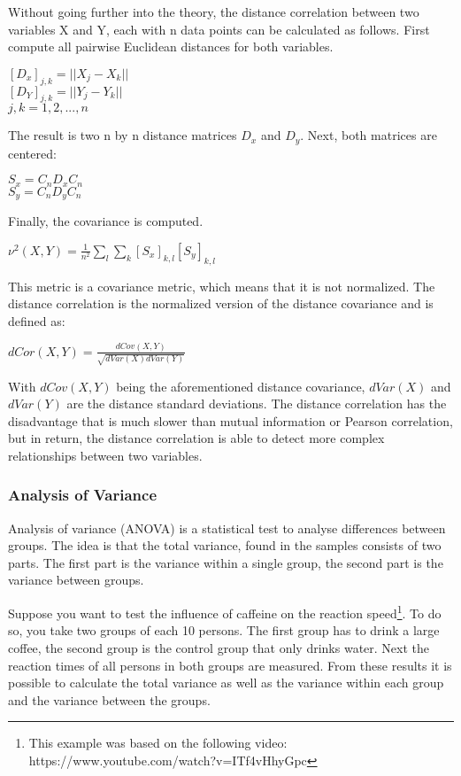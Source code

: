 Without going further into the theory, the distance correlation between two variables X and Y, each with n data points can be calculated as follows.
First compute all pairwise Euclidean distances for both variables.
\begin{center}
$[D_x]_{j,k} = || X_j - X_k||$ \\
$[D_Y]_{j,k} = || Y_j - Y_k||$ \\
$j,k = 1,2,...,n$\\
\end{center}
The result is two n by n distance matrices $D_x$ and $D_y$. Next, both matrices are centered:
\begin{center}
$S_x = C_nD_xC_n$\\
$S_y = C_nD_yC_n$\\
\end{center}
Finally, the covariance is computed.
\begin{center}
$\nu^2(X,Y) = \frac{1}{n^2} \sum\limits_l \sum\limits_k [S_x]_{k,l}[S_y]_{k,l}$ 
\end{center}

This metric is a covariance metric, which means that it is not normalized. The distance correlation is the normalized version of the distance covariance and is defined as:

\begin{center}
$dCor(X,Y) = \frac{dCov(X,Y)}{\sqrt{dVar(X)dVar(Y)}}$
\end{center}
With $dCov(X,Y)$ being the aforementioned distance covariance, $dVar(X)$ and $dVar(Y)$ are the distance standard deviations. The distance correlation has the disadvantage that is much slower than mutual information or Pearson correlation, but in return, the distance correlation is able to detect more complex relationships between two variables.

\subsubsection{Analysis of Variance}

Analysis of variance (ANOVA) is a statistical test to analyse differences between groups. The idea is that the total variance, found in the samples consists of two parts. The first part is the variance within a single group, the second part is the variance between groups. 

\npar

Suppose you want to test the influence of caffeine on the reaction speed\footnote{This example was based on the following video: https://www.youtube.com/watch?v=ITf4vHhyGpc}. To do so, you take two groups of each 10 persons. The first group has to drink a large coffee, the second group is the control group that only drinks water. Next the reaction times of all persons in both groups are measured. From these results it is possible to calculate the total variance as well as the variance within each group and the variance between the groups. 

